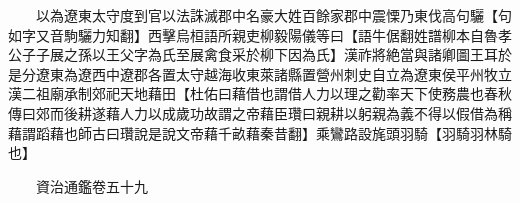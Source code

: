 　　以為遼東太守度到官以法誅滅郡中名豪大姓百餘家郡中震慄乃東伐高句驪【句如字又音駒驪力知翻】西擊烏桓語所親吏柳毅陽儀等曰【語牛倨翻姓譜柳本自魯孝公子子展之孫以王父字為氏至展禽食采於柳下因為氏】漢祚將絶當與諸卿圖王耳於是分遼東為遼西中遼郡各置太守越海收東萊諸縣置營州刺史自立為遼東侯平州牧立漢二祖廟承制郊祀天地藉田【杜佑曰藉借也謂借人力以理之勸率天下使務農也春秋傳曰郊而後耕遂藉人力以成歲功故謂之帝藉臣瓚曰親耕以躬親為義不得以假借為稱藉謂蹈藉也師古曰瓚說是說文帝藉千畝藉秦昔翻】乘鸞路設旄頭羽騎【羽騎羽林騎也】

　　資治通鑑卷五十九  
    


 


 



 

 
  







 


　　
　　
　
　
　


　　

　















	
	









































 
  



















 





 












  
  
  

 






